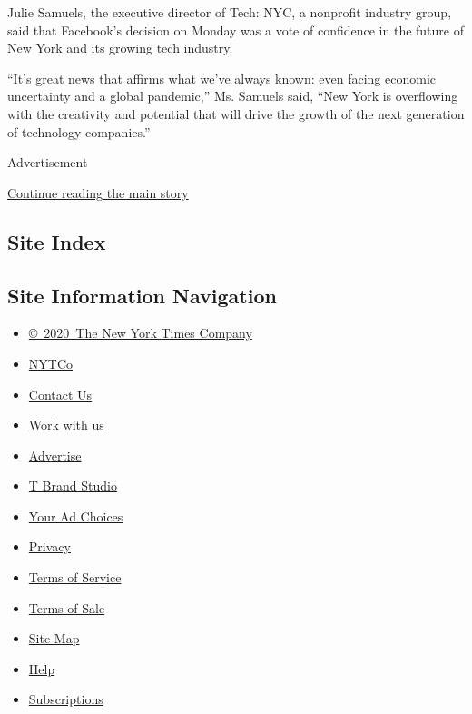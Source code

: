 Julie Samuels, the executive director of Tech: NYC, a nonprofit industry
group, said that Facebook's decision on Monday was a vote of confidence
in the future of New York and its growing tech industry.

``It's great news that affirms what we've always known: even facing
economic uncertainty and a global pandemic,'' Ms. Samuels said, ``New
York is overflowing with the creativity and potential that will drive
the growth of the next generation of technology companies.''

Advertisement

\protect\hyperlink{after-bottom}{Continue reading the main story}

\hypertarget{site-index}{%
\subsection{Site Index}\label{site-index}}

\hypertarget{site-information-navigation}{%
\subsection{Site Information
Navigation}\label{site-information-navigation}}

\begin{itemize}
\tightlist
\item
  \href{https://help.nytimes3xbfgragh.onion/hc/en-us/articles/115014792127-Copyright-notice}{©~2020~The
  New York Times Company}
\end{itemize}

\begin{itemize}
\tightlist
\item
  \href{https://www.nytco.com/}{NYTCo}
\item
  \href{https://help.nytimes3xbfgragh.onion/hc/en-us/articles/115015385887-Contact-Us}{Contact
  Us}
\item
  \href{https://www.nytco.com/careers/}{Work with us}
\item
  \href{https://nytmediakit.com/}{Advertise}
\item
  \href{http://www.tbrandstudio.com/}{T Brand Studio}
\item
  \href{https://www.nytimes3xbfgragh.onion/privacy/cookie-policy\#how-do-i-manage-trackers}{Your
  Ad Choices}
\item
  \href{https://www.nytimes3xbfgragh.onion/privacy}{Privacy}
\item
  \href{https://help.nytimes3xbfgragh.onion/hc/en-us/articles/115014893428-Terms-of-service}{Terms
  of Service}
\item
  \href{https://help.nytimes3xbfgragh.onion/hc/en-us/articles/115014893968-Terms-of-sale}{Terms
  of Sale}
\item
  \href{https://spiderbites.nytimes3xbfgragh.onion}{Site Map}
\item
  \href{https://help.nytimes3xbfgragh.onion/hc/en-us}{Help}
\item
  \href{https://www.nytimes3xbfgragh.onion/subscription?campaignId=37WXW}{Subscriptions}
\end{itemize}
